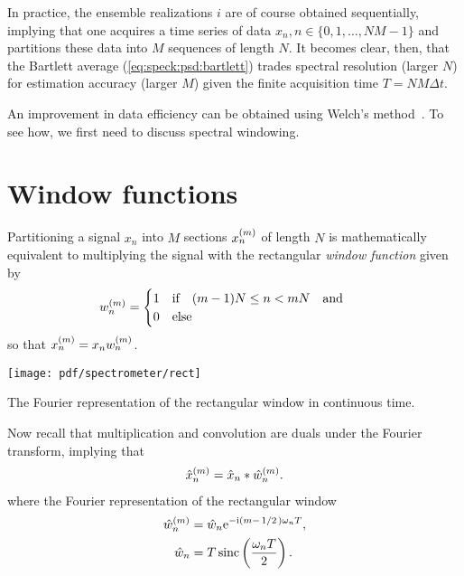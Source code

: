 In practice, the ensemble realizations $i$ are of course obtained sequentially, implying that one acquires a time series of data $x_n, n\in\lbrace0, 1, \dotsc, NM - 1\rbrace$ and partitions these data into $M$ sequences of length $N$.
It becomes clear, then, that the Bartlett average (\cref{eq:speck:psd:bartlett}) trades spectral resolution (larger $N$) for estimation accuracy (larger $M$) given the finite acquisition time $T = NM\Delta t$.

An improvement in data efficiency can be obtained using Welch's method~\cite{Welch1967}.
To see how, we first need to discuss spectral windowing.

\section{Window functions}\label{sec:speck:theory:windows}
Partitioning a signal $x_n$ into $M$ sections $x_n^{(m)}$ of length $N$ is mathematically equivalent to multiplying the signal with the rectangular \emph{window function} given by
\begin{align}\label{eq:speck:window:boxcar}
    w_n\gth{m} =
    \begin{cases}
        1\qif (m - 1) N \leq n < m N\qand \\
        0\qelse
    \end{cases}
\end{align}
so that $x_n^{(m)} = x_n w_n^{(m)}$.
\begin{marginfigure}
    \centering
    \texttt{[image: pdf/spectrometer/rect]}
    \caption{The Fourier representation of the rectangular window in continuous time.}
    \label{fig:boxcar_fourier}
\end{marginfigure}
Now recall that multiplication and convolution are duals under the Fourier transform, implying that
\begin{align}\label{eq:speck:window:ft_pairs}
    \hat{x}_n^{(m)} = \hat{x}_n \ast \hat{w}_n^{(m)}.
\end{align}
where the Fourier representation of the rectangular window
\begin{align}
    \hat{w}_n\gth{m} &= \hat{w}_n \e^{-\i(m - \flatfrac{1}{2})\omega_n T}, \label{eq:speck:window:boxcar:fourier}\\
             \hat{w}_n &= T\sinc\left(\frac{\omega_n T}{2}\right). \label{eq:speck:window:boxcar:fourier:unshifted}
\end{align}
